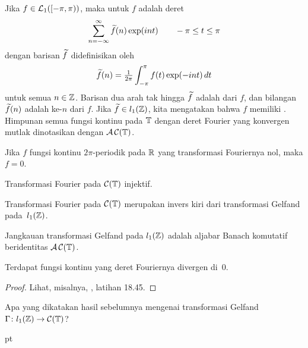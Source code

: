 \begin{defn} Jika $f \in \mathcal{L}_1([-\pi,\pi))$, maka
 untuk $f$ adalah deret
   \[ \sum_{n=-\infty}^\infty\widetilde{f}(n)\exp(int) \qquad -\pi \le t \le \pi \]
dengan barisan $\widetilde{f}$ didefinisikan oleh
   \[ \widetilde{f}(n) = {\textstyle\frac1{2\pi}}\int_{-\pi}^\pi f(t)\exp(-int)\,dt \]
untuk semua $n \in \mathbb{Z}$. Barisan dua arah tak hingga $\widetilde{f}$ adalah
 dari $f$, dan bilangan $\widetilde{f}(n)$ adalah
 ke-$n$ dari $f$. Jika $\widetilde{f} \in l_1(\mathbb{Z})$, kita mengatakan bahwa $f$ memiliki
. Himpunan semua fungsi kontinu pada $\mathbb{T}$
dengan deret Fourier yang konvergen mutlak dinotasikan dengan
$\mathcal{A\,C}(\mathbb{T})$.
\end{defn}

\begin{prop} Jika $f$ fungsi kontinu $2\pi$-periodik pada $\mathbb{R}$ yang transformasi Fouriernya nol,
maka $f = 0$.
\end{prop}

\begin{cor} Transformasi Fourier pada $\mathcal{C}(\mathbb{T})$ injektif.
\end{cor}

\begin{prop} Transformasi Fourier pada $\mathcal{C}(\mathbb{T})$ merupakan invers kiri dari transformasi Gelfand
pada~$l_1(\mathbb{Z})$.
\end{prop}

\begin{prop} Jangkauan transformasi Gelfand pada $l_1(\mathbb{Z})$ adalah aljabar Banach komutatif beridentitas
$\mathcal{A\,C}(\mathbb{T})$.
\end{prop}

\begin{prop} Terdapat fungsi kontinu yang deret Fouriernya divergen di~$0$.
\end{prop}

\begin{proof} Lihat, misalnya, \cite{HewittS:1965}, latihan 18.45.  \ns
\end{proof}

Apa yang dikatakan hasil sebelumnya mengenai transformasi Gelfand $\Gamma\colon l_1(\mathbb{Z}) \rightarrow
\mathcal{C}(\mathbb{T})$?

 pt

